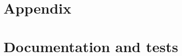 \documentclass[12pt, onecolumn,a4paper,compsoc]{IEEEtran}
\numberwithin{equation}{section}		%
\begin{document}
%




\clearpage
\newpage
%



\clearpage


\section{Appendix}


\clearpage
\section{Documentation and tests}

\clearpage

\clearpage

\end{document}
